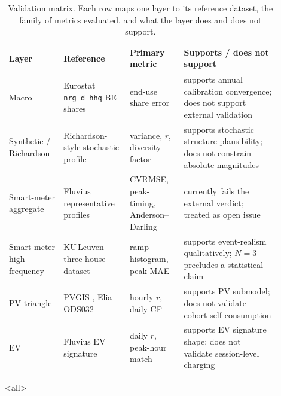 \begin{table}[ht]
  \centering
  \footnotesize
  \caption{Validation matrix. Each row maps one layer to its reference dataset, the family of metrics evaluated, and what the layer does and does not support.}
  \label{tab:validation_summary}
  \begin{tabular}{@{}p{0.18\linewidth} p{0.22\linewidth}
                   p{0.18\linewidth} p{0.32\linewidth}@{}}
    \toprule
    \textbf{Layer} & \textbf{Reference} &
      \textbf{Primary metric} & \textbf{Supports / does not support} \\
    \midrule
    Macro
      & Eurostat \texttt{nrg\_d\_hhq} BE shares
        \cite{eurostat_disaggregated_nodate}
      & end-use share error
      & supports annual calibration convergence; does not support
        external validation \\
    Synthetic / Richardson
      & Richardson-style stochastic profile
        \cite{Richardson2010CRESTElectricity}
      & variance, $r$, diversity factor
      & supports stochastic structure plausibility; does not
        constrain absolute magnitudes \\
    Smart-meter aggregate
      & Fluvius representative profiles
        \cite{Fluvius2024OpenData}
      & CVRMSE, peak-timing, Anderson--Darling
      & currently fails the external verdict; treated as open issue \\
    Smart-meter high-frequency
      & KU\,Leuven three-house dataset
        \cite{KULeuven3House}
      & ramp histogram, peak MAE
      & supports event-realism qualitatively; $N=3$ precludes a
        statistical claim \\
    PV triangle
      & PVGIS \cite{Huld2012PVGIS}, Elia ODS032
        \cite{Elia2024PVODS032}
      & hourly $r$, daily CF
      & supports PV submodel; does not validate cohort
        self-consumption \\
    EV
      & Fluvius EV signature \cite{Fluvius2024OpenData}
      & daily $r$, peak-hour match
      & supports EV signature shape; does not validate session-level
        charging \\
    \bottomrule
  \end{tabular}
\end{table}



\mode<all> %
